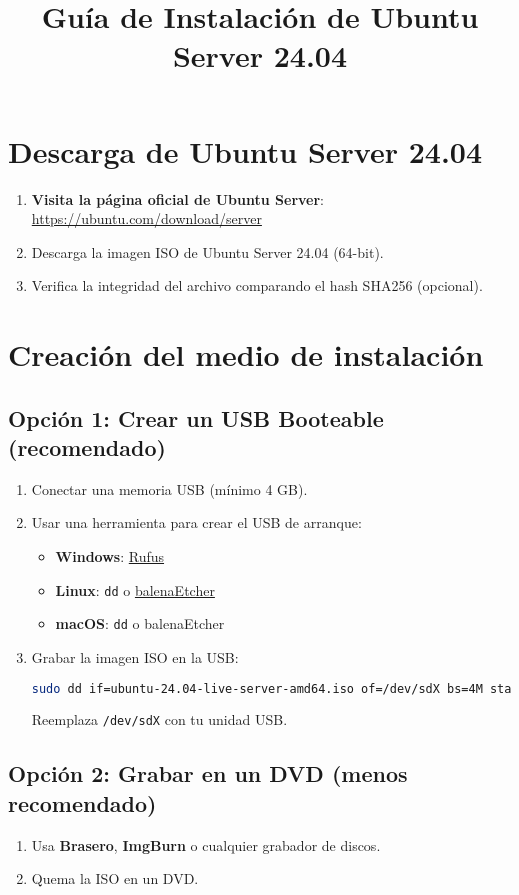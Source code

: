\documentclass{article}
\title{Guía de Instalación de Ubuntu Server 24.04}
\author{}
\date{}
\begin{document}
\maketitle

\section{Descarga de Ubuntu Server 24.04}
\begin{enumerate}
    \item \textbf{Visita la página oficial de Ubuntu Server}: \href{https://ubuntu.com/download/server}{https://ubuntu.com/download/server}
    \item Descarga la imagen ISO de Ubuntu Server 24.04 (64-bit).
    \item Verifica la integridad del archivo comparando el hash SHA256 (opcional).
\end{enumerate}

\section{Creación del medio de instalación}
\subsection{Opción 1: Crear un USB Booteable (recomendado)}
\begin{enumerate}
    \item Conectar una memoria USB (mínimo 4 GB).
    \item Usar una herramienta para crear el USB de arranque:
    \begin{itemize}
        \item \textbf{Windows}: \href{https://rufus.ie}{Rufus}
        \item \textbf{Linux}: \texttt{dd} o \href{https://www.balena.io/etcher/}{balenaEtcher}
        \item \textbf{macOS}: \texttt{dd} o balenaEtcher
    \end{itemize}
    \item Grabar la imagen ISO en la USB:
    \begin{lstlisting}[language=bash]
    sudo dd if=ubuntu-24.04-live-server-amd64.iso of=/dev/sdX bs=4M status=progress
    \end{lstlisting}
    Reemplaza \texttt{/dev/sdX} con tu unidad USB.
\end{enumerate}

\subsection{Opción 2: Grabar en un DVD (menos recomendado)}
\begin{enumerate}
    \item Usa \textbf{Brasero}, \textbf{ImgBurn} o cualquier grabador de discos.
    \item Quema la ISO en un DVD.
\end{enumerate}
\end{document}
